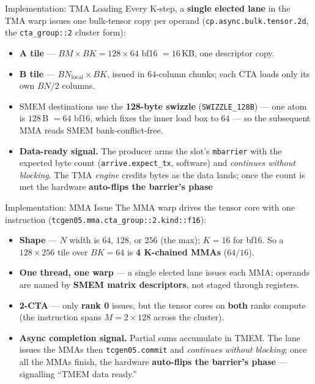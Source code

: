 \documentclass[aspectratio=169,professionalfonts]{beamer}
\newcommand{\code}[1]{\texttt{#1}}
\begin{document}
\begin{frame}{Implementation: TMA Loading}
  Every K-step, a \textbf{single elected lane} in the TMA warp issues one
  bulk-tensor copy per operand (\code{cp.async.bulk.tensor.2d}, the
  \code{cta\_group::2} cluster form):
  \begin{itemize}
    \item \textbf{A tile} --- $BM\times BK = 128\times64$ bf16 $=16$\,KB, one
      descriptor copy.
    \item \textbf{B tile} --- $BN_{\text{local}}\times BK$, issued in $64$-column
      chunks; each CTA loads only its own $BN/2$ columns.
    \item SMEM destinations use the \textbf{128-byte swizzle}
      (\code{SWIZZLE\_128B}) --- one atom is $128$\,B $= 64$ bf16, which fixes the
      inner load box to $64$ --- so the subsequent MMA reads SMEM
      bank-conflict-free.
    \item \textbf{Data-ready signal.} The producer arms the slot's \code{mbarrier}
      with the expected byte count (\code{arrive.expect\_tx}, software) and
      \emph{continues without blocking}. The TMA \emph{engine} credits bytes as
      the data lands; once the count is met the hardware \textbf{auto-flips the
      barrier's phase}
  \end{itemize}
\end{frame}

\begin{frame}{Implementation: MMA Issue}
  The MMA warp drives the tensor core with one instruction
  (\code{tcgen05.mma.cta\_group::2.kind::f16}):
  \begin{itemize}
    \item \textbf{Shape} --- $N$ width is $64$, $128$, or $256$ (the max); $K=16$
      for bf16. So a $128\times256$ tile over $BK=64$ is \textbf{4 K-chained
      MMAs} ($64/16$).
    \item \textbf{One thread, one warp} --- a single elected lane issues each MMA;
      operands are named by \textbf{SMEM matrix descriptors}, not staged through
      registers.
    \item \textbf{2-CTA} --- only \textbf{rank 0} issues, but the tensor cores on
      \textbf{both} ranks compute (the instruction spans $M = 2\times128$ across
      the cluster).
    \item \textbf{Async completion signal.} Partial sums accumulate in TMEM.
      The lane issues the MMAs then \code{tcgen05.commit} and
      \emph{continues without blocking}; once all the MMAs finish, the hardware
      \textbf{auto-flips the barrier's phase} --- signalling ``TMEM data ready.''
  \end{itemize}
\end{frame}
\end{document}
